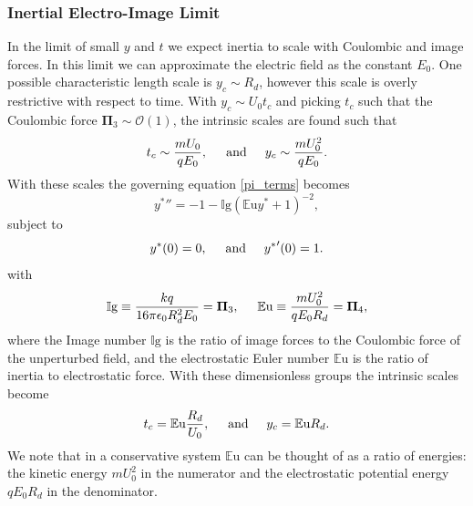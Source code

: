 \documentclass[aip,reprint, floatfix]{revtex4-1}
\begin{document}
\subsubsection{Inertial Electro-Image Limit}
In the limit of small $y$ and $t$ we expect inertia to scale with Coulombic and image forces. In this limit we can approximate the electric field as the constant $E_0$. One possible characteristic length scale is $y_c \sim R_d$, however this scale is overly restrictive with respect to time. With $y_c \sim U_0 t_c$ and picking $t_c$ such that the Coulombic force $\mathbf{\Pi}_3 \sim \mathcal{O}(1)$, the intrinsic scales are found such that
\[ t_c \sim \frac{m U_0}{q E_0}, \hspace{5 mm} \mbox{and} \hspace{5 mm} 
y_c \sim \frac{m U_0^2}{q E_0} .
\]
With these scales the governing equation \ref{pi_terms} becomes
\begin{equation}
{y^*}'' = -1 - \mathbb{I}\mbox{g} \left( \mathbb{E}\mbox{u}{y^*} + 1 \right)^{-2} , \label{img_limit}
\end{equation}
subject to
\begin{equation*}
{y^*}(0) = 0, \hspace{5 mm} \mbox{and} \hspace{5 mm} {y^*}'(0) = 1 .
\end{equation*}
with 
\[ \mathbb{I}\mbox{g} \equiv \frac{k q}{16 \pi \epsilon_0 R_d^2 E_0} = \mathbf{\Pi}_3, \hspace{5 mm}
\mathbb{E}\mbox{u} \equiv \frac{m U_0^2}{q E_0 R_d} = \mathbf{\Pi}_4 ,
\]
where the Image number $\mathbb{I}\mbox{g}$ is the ratio of image forces to the Coulombic force of the unperturbed field, and the electrostatic Euler number $\mathbb{E}\mbox{u}$ is the ratio of inertia to electrostatic force. With these dimensionless groups the intrinsic scales become
\[ t_c = \mathbb{E}\mbox{u} \frac{R_d}{U_0}, \hspace{5 mm} \mbox{and} \hspace{5 mm}
y_c = \mathbb{E}\mbox{u} R_d.
\]
We note that in a conservative system $\mathbb{E}\mbox{u}$ can be thought of as a ratio of energies: the kinetic energy $m U_0^2$ in the numerator and the electrostatic potential energy $q E_0 R_d$ in the denominator.
\end{document}
